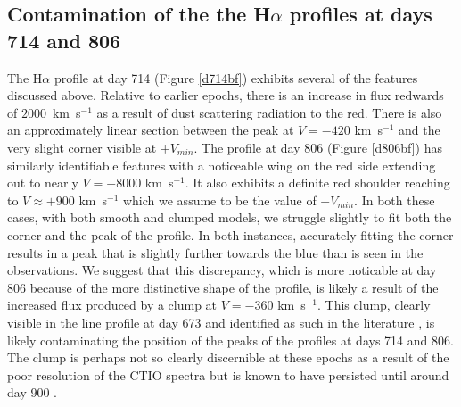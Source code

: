 \documentclass[useAMS,usenatbib,usegraphicx]{mnras}
\begin{document}
\subsection{Contamination of the the H$\alpha$ profiles at days 714 and 806}

The H$\alpha$ profile at day 714 (Figure \ref{d714bf}) exhibits several of the features discussed above.  
Relative to earlier epochs, there is an increase in flux redwards of $2000$~km~s$^{-1}$ 
as a result of dust scattering  radiation to the red.  
There is also an approximately linear section between the peak at $V=-420$ 
km~s$^{-1}$ and the very slight corner visible at $+V_{min}$.  The profile 
at day 806 (Figure \ref{d806bf}) has similarly identifiable features with a noticeable wing on 
the red side extending out to nearly $V=+8000$ km~s$^{-1}$.  It also exhibits a 
definite red shoulder reaching to $V \approx +900$ km~s$^{-1}$ which we assume 
to be the value of $+V_{min}$.  In both these cases, with both smooth and 
clumped models, we struggle slightly to fit both the corner and the peak 
of the profile.  In both instances, accurately fitting the corner results 
in a peak that is slightly further towards the blue than is seen in the 
observations.  We suggest that this discrepancy, which is more noticable 
at day 806 because of the more distinctive shape of the profile, is likely 
a result of the increased flux produced by a clump at $V=-360$ 
km~s$^{-1}$.  This clump, clearly visible in the line profile at day 673 
and identified as such in the literature 
\citep{Spyromilio1993a,Hanuschik1993}, is likely contaminating the 
position of the peaks of the profiles at days 714 and 806.  The clump is 
perhaps not so clearly discernible at these epochs as a result of the poor 
resolution of the CTIO spectra but is known to have persisted until around day 
900 \citep{Hanuschik1993}.
\end{document}
